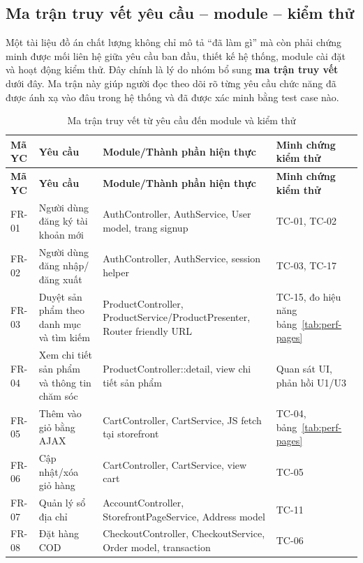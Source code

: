 \documentclass[11pt, a4paper]{article}
\begin{document}
\clearpage
\subsection{Ma trận truy vết yêu cầu -- module -- kiểm thử}

Một tài liệu đồ án chất lượng không chỉ mô tả ``đã làm gì'' mà còn phải chứng minh
được mối liên hệ giữa yêu cầu ban đầu, thiết kế hệ thống, module cài đặt và hoạt động
kiểm thử. Đây chính là lý do nhóm bổ sung \textbf{ma trận truy vết} dưới đây. Ma trận
này giúp người đọc theo dõi rõ từng yêu cầu chức năng đã được ánh xạ vào đâu trong hệ thống
và đã được xác minh bằng test case nào.

\begingroup
\footnotesize
\setlength{\tabcolsep}{2pt}
\setlength{\LTpre}{0pt}
\setlength{\LTpost}{0pt}
\begin{longtable}{|p{1.2cm}|p{4.2cm}|p{3.6cm}|p{3.6cm}|}
    \caption{Ma trận truy vết từ yêu cầu đến module và kiểm thử}
    \label{tab:traceability} \\
    \hline
    \textbf{Mã YC} & \textbf{Yêu cầu} & \textbf{Module/Thành phần hiện thực} & \textbf{Minh chứng kiểm thử} \\ \hline
    \endfirsthead
    \hline
    \textbf{Mã YC} & \textbf{Yêu cầu} & \textbf{Module/Thành phần hiện thực} & \textbf{Minh chứng kiểm thử} \\ \hline
    \endhead
    FR-01 & Người dùng đăng ký tài khoản mới & AuthController, AuthService, User model, trang signup & TC-01, TC-02 \\ \hline
    FR-02 & Người dùng đăng nhập/đăng xuất & AuthController, AuthService, session helper & TC-03, TC-17 \\ \hline
    FR-03 & Duyệt sản phẩm theo danh mục và tìm kiếm & ProductController, ProductService/ProductPresenter, Router friendly URL & TC-15, đo hiệu năng bảng~\ref{tab:perf-pages} \\ \hline
    FR-04 & Xem chi tiết sản phẩm và thông tin chăm sóc & ProductController::detail, view chi tiết sản phẩm & Quan sát UI, phản hồi U1/U3 \\ \hline
    FR-05 & Thêm vào giỏ bằng AJAX & CartController, CartService, JS fetch tại storefront & TC-04, bảng~\ref{tab:perf-pages} \\ \hline
    FR-06 & Cập nhật/xóa giỏ hàng & CartController, CartService, view cart & TC-05 \\ \hline
    FR-07 & Quản lý sổ địa chỉ & AccountController, StorefrontPageService, Address model & TC-11 \\ \hline
    FR-08 & Đặt hàng COD & CheckoutController, CheckoutService, Order model, transaction & TC-06 \\ \hline

\end{longtable}
\end{document}
